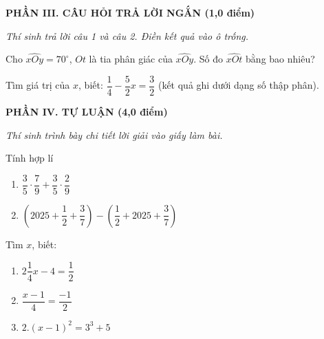 \documentclass[12pt,a4paper]{article}
\begin{document}
\setcounter{ex}{0}
\noindent\textbf{\large PHẦN III. CÂU HỎI TRẢ LỜI NGẮN (1,0 điểm)}

\textit{Thí sinh trả lời câu 1 và câu 2. Điền kết quả vào ô trống.}

\vspace{1mm}
\begin{ex}
Cho $\widehat{xOy}=70^\circ$, $Ot$ là tia phân giác của $\widehat{xOy}$. Số đo $\widehat{xOt}$ bằng bao nhiêu? 
\end{ex}

\begin{ex}
Tìm giá trị của $x$, biết: $\dfrac{1}{4}-\dfrac{5}{2}x=\dfrac{3}{2}$ (kết quả ghi dưới dạng số thập phân). 
\end{ex}


\setcounter{ex}{0}
\noindent\textbf{\large PHẦN IV. TỰ LUẬN (4,0 điểm)}

\textit{Thí sinh trình bày chi tiết lời giải vào giấy làm bài.}

\vspace{1mm}
\begin{ex}
Tính hợp lí
\begin{enumerate}[label=\textbf{\alph*)}, leftmargin=0.8cm, itemsep=1pt]
\item $\dfrac{3}{5}\cdot\dfrac{7}{9}+\dfrac{3}{5}\cdot\dfrac{2}{9}$
\item $\left(2025+\dfrac{1}{2}+\dfrac{3}{7}\right)-\left(\dfrac{1}{2}+2025+\dfrac{3}{7}\right)$
\end{enumerate}
\end{ex}
\vspace{1.5mm}

\begin{ex}
Tìm $x$, biết:
\begin{enumerate}[label=\textbf{\alph*)}, leftmargin=0.8cm, itemsep=1pt]
\item $2\dfrac{1}{4}x-4=\dfrac{1}{2}$
\item $\dfrac{x-1}{4}=\dfrac{-1}{2}$
\item $2.(x-1)^2=3^3+5$
\end{enumerate}
\end{ex}
\vspace{1.5mm}
\end{document}
